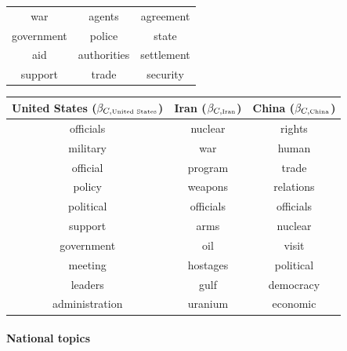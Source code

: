 \begin{table}
\begin{tabular}{|c|c|c|}
  war & agents & agreement \\
  government & police & state\\
  aid & authorities & settlement \\
  support & trade & security \\
  \hline
\end{tabular}
\vspace{10pt}
\begin{tabular}{|c|c|c|}
  \hline
  \textbf{United States ($\beta_{C,\mbox{\tiny United States}}$)} &
  \textbf{Iran ($\beta_{C,\mbox{\tiny Iran}}$)} &
  \textbf{China ($\beta_{C,\mbox{\tiny China}}$)} \\
  \hline
  officials & nuclear & rights \\
  military & war & human \\
  official & program & trade \\
  policy & weapons & relations \\
  political & officials & officials \\
  support & arms & nuclear \\
  government & oil & visit \\
  meeting & hostages & political \\
  leaders & gulf & democracy \\
  administration & uranium & economic \\
  \hline
\end{tabular}
\end{table}
\paragraph{National topics}



